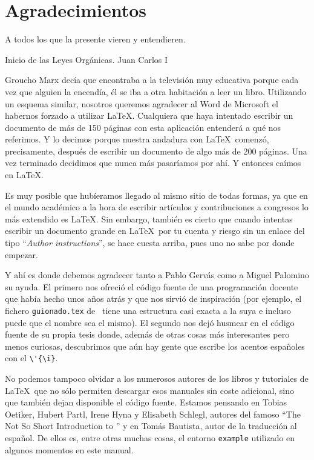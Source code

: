 
\chapter{Agradecimientos}


\begin{FraseCelebre}
\begin{Frase}
A todos los que la presente vieren y entendieren.
\end{Frase}
\begin{Fuente}
Inicio de las Leyes Orgánicas. Juan Carlos I
\end{Fuente}
\end{FraseCelebre}

Groucho Marx decía que encontraba a la televisión muy educativa porque
cada vez que alguien la encendía, él se iba a otra habitación a leer
un libro. Utilizando un esquema similar, nosotros queremos agradecer
al Word de Microsoft el habernos forzado a utilizar \LaTeX. Cualquiera
que haya intentado escribir un documento de más de 150 páginas con
esta aplicación entenderá a qué nos referimos. Y lo decimos porque
nuestra andadura con \LaTeX\ comenzó, precisamente, después de
escribir un documento de algo más de 200 páginas. Una vez terminado
decidimos que nunca más pasaríamos por ahí. Y entonces caímos en
\LaTeX.

Es muy posible que hubíeramos llegado al mismo sitio de todas formas,
ya que en el mundo académico a la hora de escribir artículos y
contribuciones a congresos lo más extendido es \LaTeX. Sin embargo,
también es cierto que cuando intentas escribir un documento grande
en \LaTeX\ por tu cuenta y riesgo sin un enlace del tipo ``\emph{Author
  instructions}'', se hace cuesta arriba, pues uno no sabe por donde
empezar.

Y ahí es donde debemos agradecer tanto a Pablo Gervás como a Miguel
Palomino su ayuda. El primero nos ofreció el código fuente de una
programación docente que había hecho unos años atrás y que nos sirvió
de inspiración (por ejemplo, el fichero \texttt{guionado.tex} de
\texis\ tiene una estructura casi exacta a la suya e incluso puede
que el nombre sea el mismo). El segundo nos dejó husmear en el código
fuente de su propia tesis donde, además de otras cosas más
interesantes pero menos curiosas, descubrimos que aún hay gente que
escribe los acentos españoles con el \verb+\'{\i}+.

No podemos tampoco olvidar a los numerosos autores de los libros y
tutoriales de \LaTeX\ que no sólo permiten descargar esos manuales sin
coste adicional, sino que también dejan disponible el código fuente.
Estamos pensando en Tobias Oetiker, Hubert Partl, Irene Hyna y
Elisabeth Schlegl, autores del famoso ``The Not So Short Introduction
to \LaTeXe'' y en Tomás Bautista, autor de la traducción al español. De
ellos es, entre otras muchas cosas, el entorno \texttt{example}
utilizado en algunos momentos en este manual.

